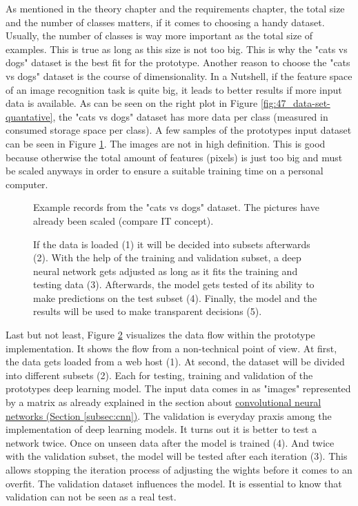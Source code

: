As mentioned in the theory chapter and the requirements chapter, the total size and the number of classes matters, if it comes to choosing a handy dataset. Usually, the number of classes is way more important as the total size of examples. This is true as long as this size is not too big. This is why the "cats vs dogs" dataset is the best fit for the prototype. Another reason to choose the "cats vs dogs" dataset is the course of dimensionality. In a Nutshell, if the feature space of an image recognition task is quite big, it leads to better results if more input data is available. As can be seen on the right plot in Figure \ref{fig:47_data-set-quantative}, the "cats vs dogs" dataset has more data per class (measured in consumed storage space per class). A few samples of the prototypes input dataset can be seen in Figure \ref{fig:38_to_predict_images.png}. The images are not in high definition. This is good because otherwise the total amount of features (pixels) is just too big and must be scaled anyways in order to ensure a suitable training time on a personal computer. 

\begin{figure}[htp]
	\centering
	\caption{Example records from the "cats vs dogs" dataset. The pictures have already been scaled (compare IT concept).}
	\label{fig:38_to_predict_images.png}
\end{figure}

\begin{figure}[htp]
	\centering
	\caption{
		If the data is loaded (1) it will be decided into subsets afterwards (2). With the help of the training and validation subset, a deep neural network gets adjusted as long as it fits the training and testing data (3). Afterwards, the model gets tested of its ability to make predictions on the test subset (4). Finally, the model and the results will be used to make transparent decisions (5).}
	\label{fig:46_data_model}
\end{figure}

Last but not least, Figure \ref{fig:46_data_model}  visualizes the data flow within the prototype implementation. It shows the flow from a non-technical point of view. At first, the data gets loaded from a web host (1). At second, the dataset will be divided into different subsets (2). Each for testing, training and validation of the prototypes deep learning model. The input data comes in as "images" represented by a matrix as already explained in the section about \hyperref[subsec:cnn]{convolutional neural networks (Section \ref{subsec:cnn})}.  The validation is everyday praxis among the implementation of deep learning models. It turns out it is better to test a network twice. Once on unseen data after the model is trained (4). And twice with the validation subset, the model will be tested after each iteration (3). This allows stopping the iteration process of adjusting the wights before it comes to an overfit. The validation dataset influences the model. It is essential to know that validation can not be seen as a real test. 


